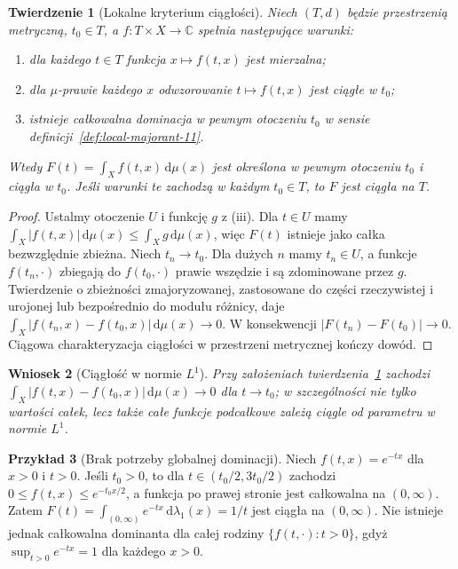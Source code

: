 \documentclass[11pt,a4paper,oneside]{book}
\numberwithin{equation}{chapter}
\theoremstyle{plain}
\newtheorem{twierdzenie}{Twierdzenie}[chapter]
\newtheorem{wniosek}[twierdzenie]{Wniosek}
\theoremstyle{definition}
\newtheorem{przyklad}[twierdzenie]{Przykład}
\theoremstyle{remark}
\begin{document}
\begin{twierdzenie}[Lokalne kryterium ciągłości]
\label{thm:local-continuity-11}
Niech $(T,d)$ będzie przestrzenią metryczną, $t_0\in T$,
a $f:T\times X\to\mathbb C$ spełnia następujące warunki:
\begin{enumerate}[label=\textup{(\roman*)}]
\item dla każdego $t\in T$ funkcja $x\mapsto f(t,x)$ jest mierzalna;
\item dla $\mu$-prawie każdego $x$ odwzorowanie $t\mapsto f(t,x)$
      jest ciągłe w $t_0$;
\item istnieje całkowalna dominacja w pewnym otoczeniu $t_0$
      w sensie definicji~\ref{def:local-majorant-11}.
\end{enumerate}
Wtedy $F(t)=\int_X f(t,x)\,\mathrm d\mu(x)$ jest określona
w pewnym otoczeniu $t_0$ i ciągła w $t_0$.
Jeśli warunki te zachodzą w każdym $t_0\in T$, to $F$ jest
ciągła na $T$.
\end{twierdzenie}
\begin{proof}
Ustalmy otoczenie $U$ i funkcję $g$ z (iii). Dla $t\in U$
mamy $\int_X|f(t,x)|\,\mathrm d\mu(x)\le\int_Xg\,\mathrm d\mu(x)$,
więc $F(t)$ istnieje jako całka bezwzględnie zbieżna. Niech
$t_n\to t_0$. Dla dużych $n$ mamy $t_n\in U$, a funkcje
$f(t_n,\cdot)$ zbiegają do $f(t_0,\cdot)$ prawie wszędzie i
są zdominowane przez $g$. Twierdzenie o zbieżności zmajoryzowanej,
zastosowane do części rzeczywistej i urojonej lub bezpośrednio
do modułu różnicy, daje
$\int_X |f(t_n,x)-f(t_0,x)|\,\mathrm d\mu(x)\to0$.
W konsekwencji $|F(t_n)-F(t_0)|\to0$. Ciągowa charakteryzacja
ciągłości w przestrzeni metrycznej kończy dowód.
\end{proof}

\begin{wniosek}[Ciągłość w normie $L^1$]
\label{cor:l1-param-11}
Przy założeniach twierdzenia~\ref{thm:local-continuity-11}
zachodzi $\int_X|f(t,x)-f(t_0,x)|\,\mathrm d\mu(x)\to0$
dla $t\to t_0$; w szczególności nie tylko wartości całek,
lecz także całe funkcje podcałkowe zależą ciągle od parametru
w normie $L^1$.
\end{wniosek}

\begin{przyklad}[Brak potrzeby globalnej dominacji]
Niech $f(t,x)=e^{-tx}$ dla $x>0$ i $t>0$. Jeśli $t_0>0$,
to dla $t\in(t_0/2,3t_0/2)$ zachodzi
$0\le f(t,x)\le e^{-t_0x/2}$, a funkcja po prawej stronie
jest całkowalna na $(0,\infty)$. Zatem
$F(t)=\int_{(0,\infty)}e^{-tx}\,\mathrm d\lambda_1(x)=1/t$
jest ciągła na $(0,\infty)$. Nie istnieje jednak całkowalna
dominanta dla całej rodziny $\{f(t,\cdot):t>0\}$, gdyż
$\sup_{t>0} e^{-tx}=1$ dla każdego $x>0$.
\end{przyklad}
\end{document}
